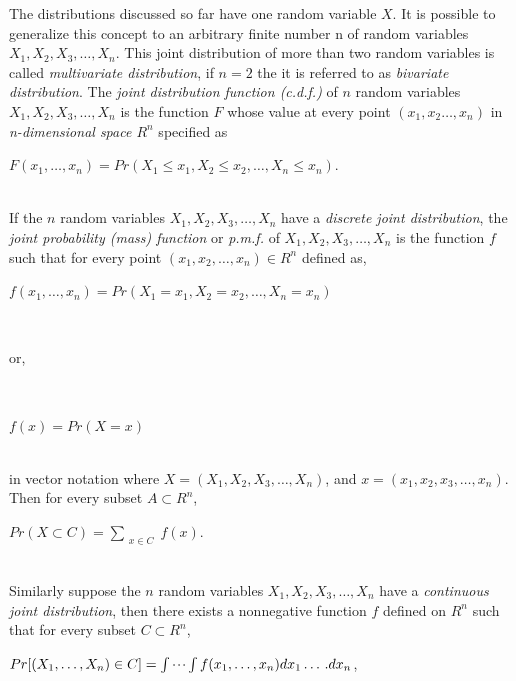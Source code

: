 \documentclass[12pt,twoside]{reedthesis}
\begin{document}
\begin{enumerate}
\begin{enumerate}
The distributions discussed so far have one random variable $X$. It is possible to generalize this concept to an arbitrary finite number n of random variables $X_1, X_2, X_3, \dotsc, X_n$. This joint distribution of more than two random variables is called \textit{multivariate distribution}, if $n = 2$ the it is referred to as \textit{bivariate distribution}. The \textit{joint distribution function (c.d.f.)} of $n$ random variables $X_1, X_2, X_3, \dotsc, X_n$ is the function $F$ whose value at every point $(x_1, x_2 \dotsc, x_n)$ in \textit{n-dimensional space $R^n$} specified as
\begin{center}
$F(x_1, \dotsc, x_n ) = Pr(X_1 \leq x_1, X_2 \leq x_2, \dotsc, X_n \leq x_n )$.
\end{center}\\

If the $n$ random variables $X_1, X_2, X_3, \dotsc, X_n$ have a \textit{discrete joint distribution}, the \textit{joint probability (mass) function} or \textit{p.m.f.} of $X_1, X_2, X_3, \dotsc , X_n$  is the function $f$ such that for every point $(x_1, x_2, … , x_n) \in R^n$ defined as,

\begin{center}
$f(x_1, …, x_n ) = Pr(X_1 = x_1, X_2 = x_2, \dotsc, X_n = x_n )$
\end{center}\\

\begin{center}
or,
\end{center}\\

\begin{center}
$f(x) = Pr(X = x)$
\end{center}\\

in vector notation where $X = (X_1, X_2, X_3, \dotsc, X_n )$, and $x = (x_1, x_2, x_3, \dotsc, x_n )$. Then for every subset $A \subset R^n$,
\begin{center}
$Pr(X \subset C) =\sum\limits_{\substack{x \in C}} f(x)$.
\end{center}\\

Similarly suppose the $n$ random variables $X_1, X_2, X_3, \dotsc, X_n$ have a \textit{continuous joint distribution}, then there exists a nonnegative function $f$ defined on $R^n$ such that for every subset $C \subset R^n$,
\begin{center}
$Pr[(X_1, \dotsc, X_n) \in C] = \idotsint f(x_1, \dotsc, x_n) dx_1 \dotsc. dx_n$,
\end{center}\\


\end{enumerate}
\end{enumerate}
\end{document}
